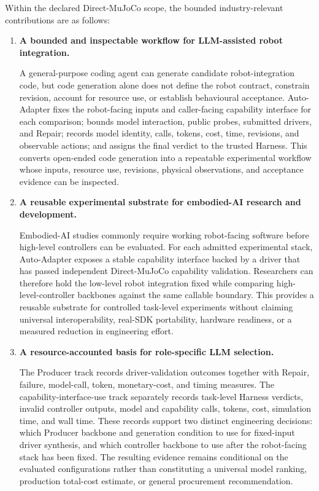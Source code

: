 Within the declared Direct-MuJoCo scope, the bounded industry-relevant
contributions are as follows:

\begin{enumerate}[leftmargin=*,itemsep=0.8em]

  \item \textbf{A bounded and inspectable workflow for LLM-assisted robot
  integration.}

  A general-purpose coding agent can generate candidate robot-integration code,
  but code generation alone does not define the robot contract, constrain
  revision, account for resource use, or establish behavioural acceptance.
  Auto-Adapter fixes the robot-facing inputs and caller-facing capability
  interface for each comparison; bounds model interaction, public probes,
  submitted drivers, and Repair; records model identity, calls, tokens, cost,
  time, revisions, and observable actions; and assigns the final verdict to the
  trusted Harness. This converts open-ended code generation into a repeatable
  experimental workflow whose inputs, resource use, revisions, physical
  observations, and acceptance evidence can be inspected.

  \item \textbf{A reusable experimental substrate for embodied-AI research and
  development.}

  Embodied-AI studies commonly require working robot-facing software before
  high-level controllers can be evaluated. For each admitted experimental
  stack, Auto-Adapter exposes a stable capability interface backed by a driver
  that has passed independent Direct-MuJoCo capability validation. Researchers
  can therefore hold the low-level robot integration fixed while comparing
  high-level-controller backbones against the same callable boundary. This
  provides a reusable substrate for controlled task-level experiments without
  claiming universal interoperability, real-SDK portability, hardware
  readiness, or a measured reduction in engineering effort.

  \item \textbf{A resource-accounted basis for role-specific LLM selection.}

  The Producer track records driver-validation outcomes together with Repair,
  failure, model-call, token, monetary-cost, and timing measures. The
  capability-interface-use track separately records task-level Harness
  verdicts, invalid controller outputs, model and capability calls, tokens,
  cost, simulation time, and wall time. These records support two distinct
  engineering decisions: which Producer backbone and generation condition to
  use for fixed-input driver synthesis, and which controller backbone to use
  after the robot-facing stack has been fixed. The resulting evidence remains
  conditional on the evaluated configurations rather than constituting a
  universal model ranking, production total-cost estimate, or general
  procurement recommendation.

\end{enumerate}

